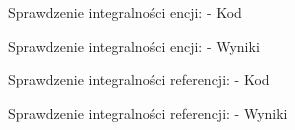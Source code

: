 \begin{figure}[H]
    \centering
    \caption{Sprawdzenie integralności encji: - Kod}
\end{figure}
\begin{figure}[H]
    \centering
    \caption{Sprawdzenie integralności encji: - Wyniki}
\end{figure}
\begin{figure}[H]
    \centering
    \caption{Sprawdzenie integralności referencji: - Kod}
\end{figure}
\begin{figure}[H]
    \centering
    \caption{Sprawdzenie integralności referencji: - Wyniki}
\end{figure}

\newpage

